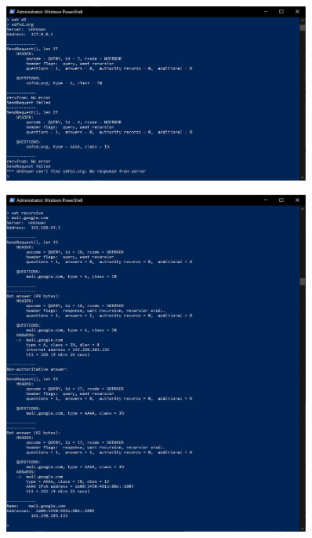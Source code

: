 \documentclass[12pt]{extarticle}
\begin{document}
\begin{figure}[H]
    \centering
    \includegraphics[width=0.90\textwidth]{no_server}
    \caption{}
\end{figure}

\begin{figure}[H]
    \centering
    \includegraphics[width=0.90\textwidth]{recursion}
    \caption{}
\end{figure}
\end{document}
